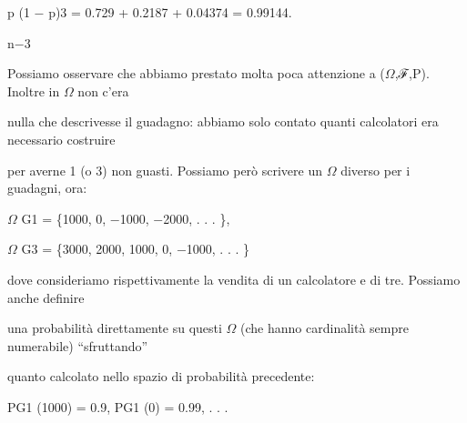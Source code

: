 \documentclass[a4paper,portrait,12pt]{article}
\begin{document}
\begin{flushleft}
p (1 $-$ p)3 = 0.729 + 0.2187 + 0.04374 = 0.99144.
\end{flushleft}


\begin{flushleft}
n$-$3
\end{flushleft}





\begin{flushleft}
Possiamo osservare che abbiamo prestato molta poca attenzione a ($\Omega$,ℱ,P). Inoltre in $\Omega$ non c'era
\end{flushleft}


\begin{flushleft}
nulla che descrivesse il guadagno: abbiamo solo contato quanti calcolatori era necessario costruire
\end{flushleft}


\begin{flushleft}
per averne 1 (o 3) non guasti. Possiamo per\`{o} scrivere un $\Omega$ diverso per i guadagni, ora:
\end{flushleft}


\begin{flushleft}
$\Omega$ G1 = \{1000, 0, $-$1000, $-$2000, . . . \},
\end{flushleft}





\begin{flushleft}
$\Omega$ G3 = \{3000, 2000, 1000, 0, $-$1000, . . . \}
\end{flushleft}





\begin{flushleft}
dove consideriamo rispettivamente la vendita di un calcolatore e di tre. Possiamo anche definire
\end{flushleft}


\begin{flushleft}
una probabilit\`{a} direttamente su questi $\Omega$ (che hanno cardinalit\`{a} sempre numerabile) {``}sfruttando''
\end{flushleft}


\begin{flushleft}
quanto calcolato nello spazio di probabilit\`{a} precedente:
\end{flushleft}


\begin{flushleft}
PG1 (1000) = 0.9, PG1 (0) = 0.99, . . .
\end{flushleft}
\end{document}
